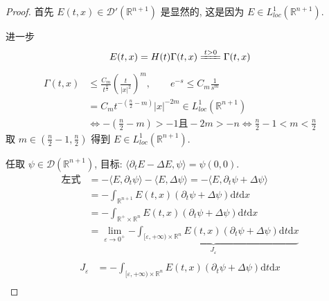 \documentclass[11pt]{ctexart}[UTF8]
\begin{document}
\begin{proof}
    首先 $E(t,x) \in \mathscr{D}'(\mathbb{R}^{n+1})$ 是显然的, 这是因为 $E \in L^1_{loc}(\mathbb{R}^{n+1})$.\par
    进一步
    \begin{equation*}
        E(t,x) = H(t) \Gamma(t,x) \xlongequal{t >0} \Gamma(t,x)
    \end{equation*}
    \begin{equation*}
        \begin{aligned}
            \Gamma(t,x) &\leq \frac{C_{m}}{t^{\frac{n}{2}}} \left(\frac{t}{|x|^2} \right)^{m},\quad\quad e^{-s}\leq C_{m}\frac{1}{s^{m}}\\
                        &= C_{m}t^{-\left(\frac{n}{2}-m\right)} |x|^{-2m} \in L^1_{loc}(\mathbb{R}^{n+1})\\
                        & \Longleftrightarrow -\left(\frac{n}{2}-m\right)>-1 \text{且} -2m > -n \Longleftrightarrow \frac{n}{2}-1 < m < \frac{n}{2}
        \end{aligned}
    \end{equation*}
    取 $m \in \left(\frac{n}{2}-1, \frac{n}{2}\right)$ 得到 $E \in L^1_{loc}(\mathbb{R}^{n+1})$.\par
    任取 $\psi \in \mathscr{D}(\mathbb{R}^{n+1})$, 目标: $\langle \partial_{t} E - \Delta E, \psi \rangle = \psi(0,0)$.
    \begin{equation*}
        \begin{aligned}
            \text{左式} &= -\langle E, \partial_t \psi \rangle - \langle E, \Delta \psi \rangle = -\langle E, \partial_t \psi + \Delta \psi \rangle \\
                   &= -\int_{\mathbb{R}^{n+1}} E(t,x) (\partial_t \psi + \Delta \psi) \mathrm{d}t\mathrm{d}x\\
                   &= -\int_{\mathbb{R}^{+}\times\mathbb{R}^n} E(t,x) (\partial_t \psi + \Delta \psi) \mathrm{d}t\mathrm{d}x\\
                   &= \lim\limits_{\varepsilon \to 0^+} \underbrace{-\int_{[\varepsilon,+\infty)\times\mathbb{R}^n} E(t,x) (\partial_t \psi + \Delta \psi) \mathrm{d}t\mathrm{d}x}_{J_\varepsilon}\\
        \end{aligned}
    \end{equation*}
    \begin{equation*}
        \begin{aligned}
            J_\varepsilon &= -\int_{[\varepsilon,+\infty)\times\mathbb{R}^n} E(t,x) (\partial_t \psi + \Delta \psi) \mathrm{d}t\mathrm{d}x\\

\end{aligned}
\end{equation*}
\end{proof}
\end{document}

